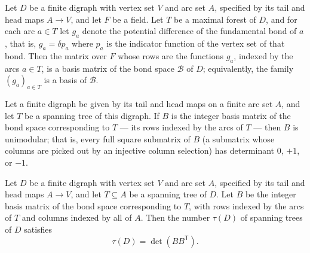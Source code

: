 \begin{theorem}
\label{CycleSpace.isBasisMatrix_bondSpace_of_maximalForest}
Let $D$ be a finite digraph with vertex set $V$ and arc set $A$, specified by its tail
and head maps $A \to V$, and let $F$ be a field. Let $T$ be a maximal forest of $D$, and
for each arc $a \in T$ let $g_a$ denote the potential difference of the fundamental bond
of $a$, that is, $g_a = \delta p_a$ where $p_a$ is the indicator function of the vertex
set of that bond. Then the matrix over $F$ whose rows are the functions $g_a$, indexed
by the arcs $a \in T$, is a basis matrix of the bond space $\mathcal{B}$ of $D$;
equivalently, the family $(g_a)_{a \in T}$ is a basis of $\mathcal{B}$.
\end{theorem}

\begin{theorem}
\label{CycleSpace.isUnimodular_basisMatrix_bondSpace}
Let a finite digraph be given by its tail and head maps on a finite arc set $A$, and let
$T$ be a spanning tree of this digraph. If $B$ is the integer basis matrix of the bond
space corresponding to $T$ — its rows indexed by the arcs of $T$ — then $B$ is
unimodular; that is, every full square submatrix of $B$ (a submatrix whose columns are
picked out by an injective column selection) has determinant $0$, $+1$, or $-1$.
\end{theorem}

\begin{theorem}
\label{CycleSpace.tau_eq_det_mul_transpose}
Let $D$ be a finite digraph with vertex set $V$ and arc set $A$, specified by its tail
and head maps $A \to V$, and let $T \subseteq A$ be a spanning tree of $D$. Let $B$ be
the integer basis matrix of the bond space corresponding to $T$, with rows indexed by
the arcs of $T$ and columns indexed by all of $A$. Then the number $\tau(D)$ of spanning
trees of $D$ satisfies \[ \tau(D) = \det\!\left(B B^{\mathsf T}\right). \]
\end{theorem}

